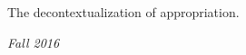 The decontextualization of appropriation.

\begin{flushright}
\textit{Fall 2016}
\end{flushright}




\groupendnotes

